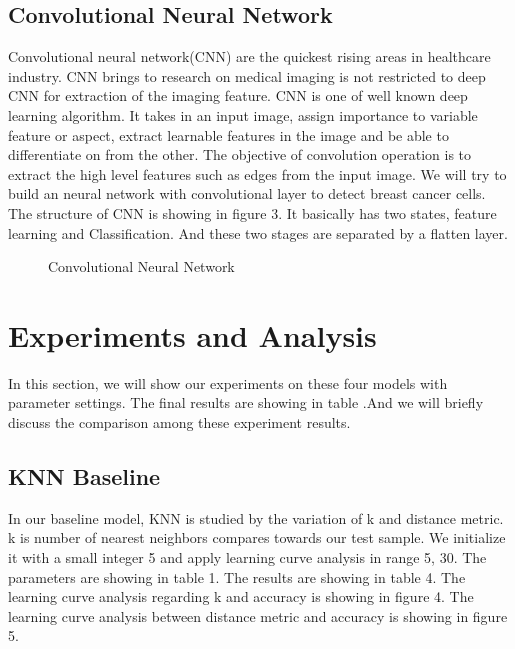 \documentclass{article} %
\begin{document}
\subsection{Convolutional Neural Network}

Convolutional neural network(CNN) are the quickest rising areas in healthcare industry. CNN brings to research on medical imaging is not restricted to deep CNN for extraction of the imaging feature. CNN is one of well known deep learning algorithm. It takes in an input image, assign importance to variable feature or aspect, extract learnable features in the image and be able to differentiate on from the other. The objective of convolution operation is to extract the high level features such as edges from the input image. We will try to build an neural network with convolutional layer to detect breast cancer cells. The structure of CNN is showing in figure 3. It basically has two states, feature learning and Classification. And these two stages are separated by a flatten layer. 

\begin{figure}[H]
\begin{center}
\caption{Convolutional Neural Network}
\end{center}
\end{figure}

\section{Experiments and Analysis}
In this section, we will show our experiments on these four models with parameter settings. The final results are showing in table .And we will briefly discuss the comparison among these experiment results.
\subsection{KNN Baseline}
In our baseline model, KNN is studied by the variation of k and distance metric. k is number of nearest neighbors compares towards our test sample. We initialize it with a small integer 5 and apply learning curve analysis in range 5, 30. The parameters are showing in table 1. The results are showing in table 4. The learning curve analysis regarding k and accuracy is showing in figure 4. The learning curve analysis between distance metric and accuracy is showing in figure 5.
\end{document}
